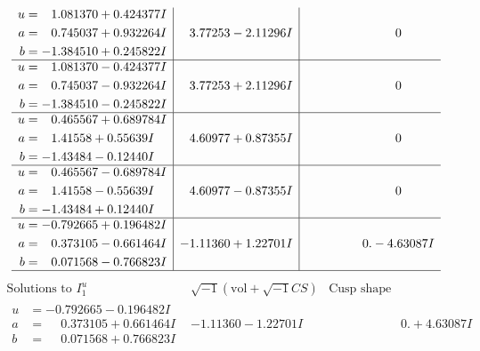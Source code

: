 \documentclass[1p]{elsarticle_modified}
\theoremstyle{definition}
\newcommand{\I}{\sqrt{-1}}
\begin{document}
$$\begin{array}{c|c|c}
\begin{aligned}
u &= \phantom{-}1.081370 + 0.424377 I \\
a &= \phantom{-}0.745037 + 0.932264 I \\
b &= -1.384510 + 0.245822 I\end{aligned}
 & \phantom{-}3.77253 - 2.11296 I & \phantom{-0.000000 } 0 \\ \hline\begin{aligned}
u &= \phantom{-}1.081370 - 0.424377 I \\
a &= \phantom{-}0.745037 - 0.932264 I \\
b &= -1.384510 - 0.245822 I\end{aligned}
 & \phantom{-}3.77253 + 2.11296 I & \phantom{-0.000000 } 0 \\ \hline\begin{aligned}
u &= \phantom{-}0.465567 + 0.689784 I \\
a &= \phantom{-}1.41558 + 0.55639 I \\
b &= -1.43484 - 0.12440 I\end{aligned}
 & \phantom{-}4.60977 + 0.87355 I & \phantom{-0.000000 } 0 \\ \hline\begin{aligned}
u &= \phantom{-}0.465567 - 0.689784 I \\
a &= \phantom{-}1.41558 - 0.55639 I \\
b &= -1.43484 + 0.12440 I\end{aligned}
 & \phantom{-}4.60977 - 0.87355 I & \phantom{-0.000000 } 0 \\ \hline\begin{aligned}
u &= -0.792665 + 0.196482 I \\
a &= \phantom{-}0.373105 - 0.661464 I \\
b &= \phantom{-}0.071568 - 0.766823 I\end{aligned}
 & -1.11360 + 1.22701 I & \phantom{-0.000000 } 0. - 4.63087 I\\
 \hline 
 \end{array}$$\newpage$$\begin{array}{c|c|c}  
\text{Solutions to }I^u_{1}& \I (\text{vol} + \sqrt{-1}CS) & \text{Cusp shape}\\
 \hline 
\begin{aligned}
u &= -0.792665 - 0.196482 I \\
a &= \phantom{-}0.373105 + 0.661464 I \\
b &= \phantom{-}0.071568 + 0.766823 I\end{aligned}
 & -1.11360 - 1.22701 I & \phantom{-0.000000 -}0. + 4.63087 I \\ \hline\begin{aligned}

\end{aligned}
\end{array}$$
\end{document}
